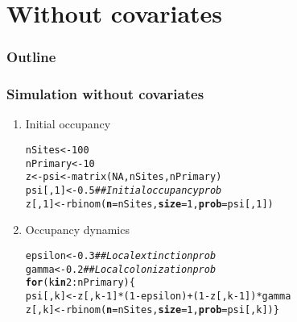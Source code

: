 \documentclass[color=usenames,dvipsnames]{beamer}\usepackage[]{graphicx}\usepackage[]{color}
\makeatletter
\newcommand{\hlnum}[1]{\textcolor[rgb]{0.69,0.494,0}{#1}}%
\newcommand{\hlcom}[1]{\textcolor[rgb]{0.514,0.506,0.514}{\textit{#1}}}%
\newcommand{\hlopt}[1]{\textcolor[rgb]{0,0,0}{#1}}%
\newcommand{\hlstd}[1]{\textcolor[rgb]{0,0,0}{#1}}%
\newcommand{\hlkwa}[1]{\textcolor[rgb]{0,0,0}{\textbf{#1}}}%
\newcommand{\hlkwb}[1]{\textcolor[rgb]{0,0.341,0.682}{#1}}%
\newcommand{\hlkwc}[1]{\textcolor[rgb]{0,0,0}{\textbf{#1}}}%
\newcommand{\hlkwd}[1]{\textcolor[rgb]{0.004,0.004,0.506}{#1}}%
\newenvironment{kframe}{%
 \def\at@end@of@kframe{}%
 \ifinner\ifhmode%
  \def\at@end@of@kframe{\end{minipage}}%
  \begin{minipage}{\columnwidth}%
 \fi\fi%
 \def\FrameCommand##1{\hskip\@totalleftmargin \hskip-\fboxsep
 \colorbox{shadecolor}{##1}\hskip-\fboxsep
     \hskip-\linewidth \hskip-\@totalleftmargin \hskip\columnwidth}%
 \MakeFramed {\advance\hsize-\width
   \@totalleftmargin\z@ \linewidth\hsize
   \@setminipage}}%
 {\par\unskip\endMakeFramed%
 \at@end@of@kframe}
\newenvironment{knitrout}{}{} %
\makeatother
\begin{document}
\section{Without covariates}


\begin{frame}
  \frametitle{Outline}
  \Large
  \tableofcontents[currentsection]
\end{frame}


\begin{frame}[fragile]
  \frametitle{Simulation without covariates}
  \small
  \vfill
  \begin{enumerate}[<+->]
    \small
  \item Initial occupancy
\begin{knitrout}\scriptsize
{}\color{fgcolor}\begin{kframe}
\begin{alltt}
\hlstd{nSites} \hlkwb{<-} \hlnum{100}
\hlstd{nPrimary} \hlkwb{<-} \hlnum{10}
\hlstd{z} \hlkwb{<-} \hlstd{psi} \hlkwb{<-} \hlkwd{matrix}\hlstd{(}\hlnum{NA}\hlstd{, nSites, nPrimary)}
\hlstd{psi[,}\hlnum{1}\hlstd{]} \hlkwb{<-} \hlnum{0.5}  \hlcom{## Initial occupancy prob}
\hlstd{z[,}\hlnum{1}\hlstd{]} \hlkwb{<-} \hlkwd{rbinom}\hlstd{(}\hlkwc{n}\hlstd{=nSites,} \hlkwc{size}\hlstd{=}\hlnum{1}\hlstd{,} \hlkwc{prob}\hlstd{=psi[,}\hlnum{1}\hlstd{])}
\end{alltt}
\end{kframe}
\end{knitrout}
  \item Occupancy dynamics
\begin{knitrout}\scriptsize
{}\color{fgcolor}\begin{kframe}
\begin{alltt}
\hlstd{epsilon} \hlkwb{<-} \hlnum{0.3} \hlcom{## Local extinction prob}
\hlstd{gamma} \hlkwb{<-} \hlnum{0.2}   \hlcom{## Local colonization prob}
\hlkwa{for}\hlstd{(k} \hlkwa{in} \hlnum{2}\hlopt{:}\hlstd{nPrimary) \{}
    \hlstd{psi[,k]} \hlkwb{<-} \hlstd{z[,k}\hlopt{-}\hlnum{1}\hlstd{]}\hlopt{*}\hlstd{(}\hlnum{1}\hlopt{-}\hlstd{epsilon)} \hlopt{+} \hlstd{(}\hlnum{1}\hlopt{-}\hlstd{z[,k}\hlopt{-}\hlnum{1}\hlstd{])}\hlopt{*}\hlstd{gamma}
    \hlstd{z[,k]} \hlkwb{<-} \hlkwd{rbinom}\hlstd{(}\hlkwc{n}\hlstd{=nSites,} \hlkwc{size}\hlstd{=}\hlnum{1}\hlstd{,} \hlkwc{prob}\hlstd{=psi[,k])    \}}
\end{alltt}
\end{kframe}
\end{knitrout}

\end{enumerate}
\end{frame}
\end{document}
